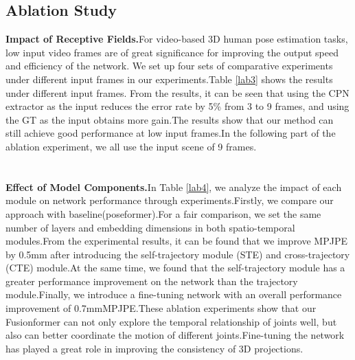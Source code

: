 \documentclass{article}
\begin{document}
\subsection{Ablation Study}
\textbf{Impact of Receptive Fields.}For video-based 3D human pose estimation tasks, low input video frames are of great significance for improving the output speed and efficiency of the network. We set up four sets of comparative experiments under different input frames in our experiments.Table \ref{lab3} shows the results under different input frames. From the results, it can be seen that using the CPN extractor as the input reduces the error rate by 5\% from 3 to 9 frames, and using the GT as the input obtains more gain.The results show that our method can still achieve good performance at low input frames.In the following part of the ablation experiment, we all use the input scene of 9 frames.\\\\\\
\textbf{Effect of Model Components.}In Table \ref{lab4}, we analyze the impact of each module on network performance through experiments.Firstly, we compare our approach with baseline(poseformer).For a fair comparison, we set the same number of layers and embedding dimensions in both spatio-temporal modules.From the experimental results, it can be found that we improve MPJPE by 0.5mm after introducing the self-trajectory module (STE) and cross-trajectory (CTE) module.At the same time, we found that the self-trajectory module has a greater performance improvement on the network than the trajectory module.Finally, we introduce a fine-tuning network with an overall performance improvement of 0.7mmMPJPE.These ablation experiments show that our Fusionformer can not only explore the temporal relationship of joints well, but also can better coordinate the motion of different joints.Fine-tuning the network has played a great role in improving the consistency of 3D projections.
\end{document}

